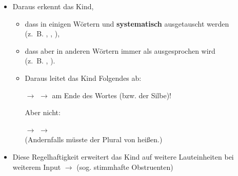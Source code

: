 \begin{frame}
		
\begin{itemize}
	\item Daraus erkennt das Kind,
	
	\begin{itemize}
		\item dass in einigen Wörtern \textipa{[d]} und \textipa{[t]} \textbf{systematisch} ausgetauscht werden \\(z.~B. , , ),
		\item dass aber in anderen Wörtern \textipa{[t]} immer als \textipa{[t]} ausgesprochen wird  \\(z.~B. , ).
		\item[]
		\item Daraus leitet das Kind Folgendes ab:
		\item[$\rightarrow$]  $\rightarrow$ \textipa{[t]} am Ende des Wortes (bzw. der Silbe)!
		\item[]
		\item[] Aber nicht:
		\item[]
		\item[$\rightarrow$]  $\rightarrow$ \textipa{[d]}\\ (Andernfalls müsste der Plural von   heißen.)
	\end{itemize}
	
	\item[]
	\item Diese Regelhaftigkeit erweitert das Kind auf weitere Lauteinheiten bei weiterem Input $\rightarrow$ 	(sog. stimmhafte Obstruenten)
\end{itemize}

\end{frame}
	



